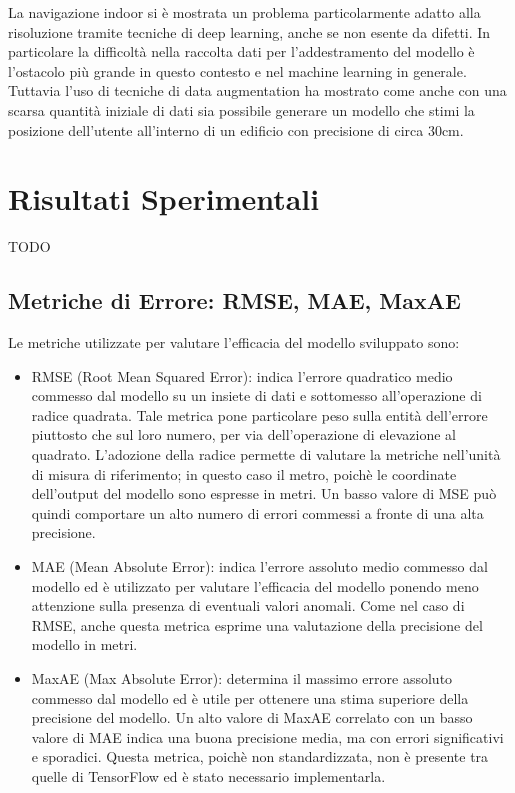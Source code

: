 
La navigazione indoor si è mostrata un problema particolarmente adatto alla
risoluzione tramite tecniche di deep learning, anche se non esente da difetti.
In particolare la difficoltà nella raccolta dati per l'addestramento del
modello è l'ostacolo più grande in questo contesto e nel machine learning in
generale. Tuttavia l'uso di tecniche di data augmentation ha mostrato come
anche con una scarsa quantità iniziale di dati sia possibile generare un
modello che stimi la posizione dell'utente all'interno di un edificio con
precisione di circa 30cm.
\section{Risultati Sperimentali}
\large{TODO} %
\subsection{Metriche di Errore: RMSE, MAE, MaxAE}
Le metriche utilizzate per valutare l'efficacia del modello sviluppato sono:
\begin{itemize}
  \item RMSE (Root Mean Squared Error): indica l'errore quadratico medio
    commesso dal modello su un insiete di dati e sottomesso all'operazione di
    radice quadrata. Tale metrica pone particolare peso sulla entità
    dell'errore piuttosto che sul loro numero, per via dell'operazione di
    elevazione al quadrato. L'adozione della radice permette di valutare la
    metriche nell'unità di misura di riferimento; in questo caso il metro,
    poichè le coordinate dell'output del modello sono espresse in metri. Un
    basso valore di MSE può quindi comportare un alto numero di errori commessi
    a fronte di una alta precisione.
  \item MAE (Mean Absolute Error): indica l'errore assoluto medio commesso dal
    modello ed è utilizzato per valutare l'efficacia del modello ponendo meno
    attenzione sulla presenza di eventuali valori anomali. Come nel caso di
    RMSE, anche questa metrica esprime una valutazione della precisione del
    modello in metri.
  \item MaxAE (Max Absolute Error): determina il massimo errore assoluto
    commesso dal modello ed è utile per ottenere una stima superiore
    della precisione del modello. Un alto valore di MaxAE correlato con un
    basso valore di MAE indica una buona precisione media, ma con errori
    significativi e sporadici. Questa metrica, poichè non standardizzata, non è
    presente tra quelle di TensorFlow ed è stato necessario implementarla.
\end{itemize}

